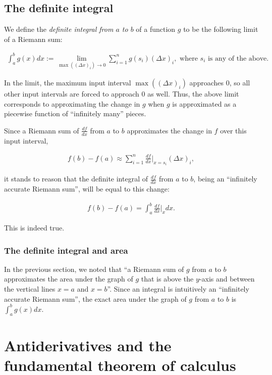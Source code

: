 \documentclass{article}
\begin{document}
\subsection*{The definite integral}

We define the \textit{definite integral from $a$ to $b$} of a function $g$ to be the following limit of a Riemann sum:

\begin{align*}
    \int_a^b g(x) dx := \lim_{\max((\Delta x)_i) \rightarrow 0} \sum_{i = 1}^n g(s_i) (\Delta x)_i, \text{ where $s_i$ is any of the above}.
\end{align*}

In the limit, the maximum input interval $\max((\Delta x)_i)$ approaches $0$, so all other input intervals are forced to approach $0$ as well. Thus, the above limit corresponds to approximating the change in $g$ when $g$ is approximated as a piecewise function of ``infinitely many'' pieces.

Since a Riemann sum of $\frac{df}{dx}$ from $a$ to $b$ approximates the change in $f$ over this input interval,

\begin{align*}
     f(b) - f(a) \approx \sum_{i = 1}^n \frac{df}{dx}\Big|_{x = s_i} (\Delta x)_i,
\end{align*}

it stands to reason that the definite integral of $\frac{df}{dx}$ from $a$ to $b$, being an ``infinitely accurate Riemann sum'', will be equal to this change:

\begin{align*}
    f(b) - f(a) = \int_a^b \frac{df}{dx}\Big|_x dx.
\end{align*}

This is indeed true.

\subsubsection*{The definite integral and area}

In the previous section, we noted that ``a Riemann sum of $g$ from $a$ to $b$ approximates the area under the graph of $g$ that is above the $y$-axis and between the vertical lines $x = a$ and $x = b$''. Since an integral is intuitively an ``infinitely accurate Riemann sum'', the exact area under the graph of $g$ from $a$ to $b$ is $\int_a^b g(x) dx$.

\section*{Antiderivatives and the fundamental theorem of calculus}
\end{document}
